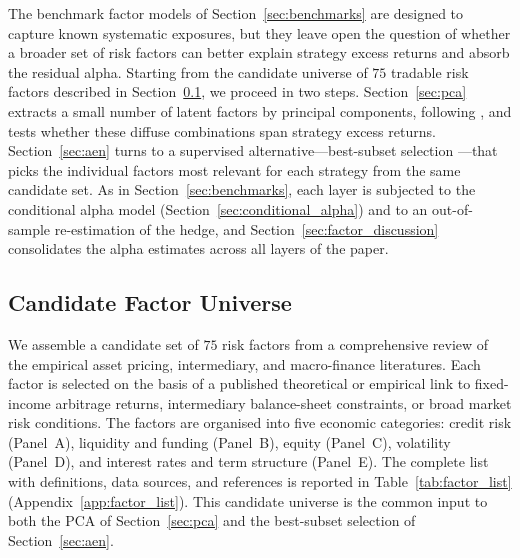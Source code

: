 


The benchmark factor models of Section~\ref{sec:benchmarks} are
designed to capture known systematic exposures, but they leave open
the question of whether a broader set of risk factors can better
explain strategy excess returns and absorb the residual alpha.
Starting from the candidate universe of $75$ tradable risk factors
described in Section~\ref{sec:factor_universe}, we proceed in two
steps. Section~\ref{sec:pca} extracts a small number of latent factors
by principal components, following \citet{connor1986performance,
connor1988risk}, and tests whether these diffuse combinations span
strategy excess returns. Section~\ref{sec:aen} turns to a supervised
alternative---best-subset selection \citep{bertsimas2016best}---that
picks the individual factors most relevant for each strategy from the
same candidate set. As in Section~\ref{sec:benchmarks}, each layer is
subjected to the conditional alpha model
(Section~\ref{sec:conditional_alpha}) and to an out-of-sample
re-estimation of the hedge, and
Section~\ref{sec:factor_discussion} consolidates the alpha estimates
across all layers of the paper.



\subsection{Candidate Factor Universe}
\label{sec:factor_universe}

We assemble a candidate set of $75$ risk factors from a comprehensive
review of the empirical asset pricing, intermediary, and macro-finance
literatures. Each factor is selected on the basis of a published
theoretical or empirical link to fixed-income arbitrage returns,
intermediary balance-sheet constraints, or broad market risk
conditions. The factors are organised into five economic categories:
credit risk (Panel~A), liquidity and funding (Panel~B), equity
(Panel~C), volatility (Panel~D), and interest rates and term
structure (Panel~E). The complete list with
definitions, data sources, and references is reported in
Table~\ref{tab:factor_list} (Appendix~\ref{app:factor_list}). This
candidate universe is the common input to both the PCA of
Section~\ref{sec:pca} and the best-subset selection of
Section~\ref{sec:aen}.

